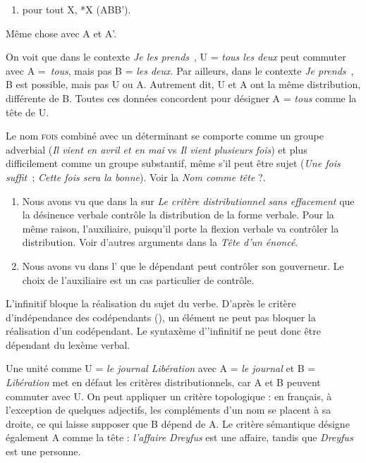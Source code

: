 {    \begin{enumerate}[label=4.] \item   pour tout X, *X (ABB’).\end{enumerate}
    Même chose avec A et A’.

     On voit que dans le contexte \textit{Je les prends}~{\longrule}, U = \textit{tous les deux} peut commuter avec A =~\textit{tous}, mais pas B = \textit{les deux}. Par ailleurs, dans le contexte \textit{Je prends}~{\longrule}, B est possible, mais pas U ou A. Autrement dit, U et A ont la même distribution, différente de B. Toutes ces données concordent pour désigner A = \textit{tous} comme la tête de U.

     Le nom \textsc{fois} combiné avec un déterminant se comporte comme un groupe adverbial (\textit{Il vient en avril et en mai} vs \textit{Il vient plusieurs fois}) et plus difficilement comme un groupe substantif, même s’il peut être sujet (\textit{Une fois suffit~}; \textit{Cette fois sera la bonne}). Voir la  \textit{Nom comme tête} ?.

    \begin{enumerate}[label=\alph*.]
    \item Nous avons vu que dans la  sur \textit{Le critère distributionnel sans effacement} que la désinence verbale contrôle la distribution de la forme verbale. Pour la même raison, l’auxiliaire, puisqu’il porte la flexion verbale va contrôler la distribution. Voir d’autres arguments dans la  \textit{Tête d’un énoncé}.

    \item Nous avons vu dans l' que le dépendant peut contrôler son gouverneur. Le choix de l’auxiliaire est un cas particulier de contrôle.
    \end{enumerate}

     L’infinitif bloque la réalisation du sujet du verbe. D’après le critère d’indépendance des codépendants (), un élément ne peut pas bloquer la réalisation d’un codépendant. Le syntaxème d’’infinitif ne peut donc être dépendant du lexème verbal.

     Une unité comme U = \textit{le journal Libération} avec A = \textit{le journal} et B = \textit{Libération} met en défaut les critères distributionnels, car A et B peuvent commuter avec U. On peut appliquer un critère topologique : en français, à l’exception de quelques adjectifs, les compléments d’un nom se placent à sa droite, ce qui laisse supposer que B dépend de A. Le critère sémantique désigne également A comme la tête : \textit{l’affaire Dreyfus} est une affaire, tandis que \textit{Dreyfus} est une personne.

}
